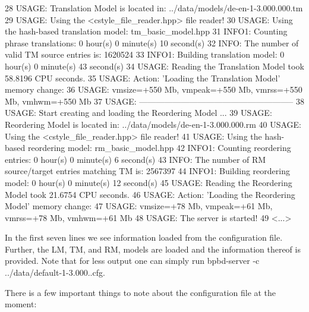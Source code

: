 \begin{DoxyCode}
28 USAGE: Translation Model is located in: ../data/models/de-en-1-3.000.000.tm
29 USAGE: Using the <cstyle\_file\_reader.hpp> file reader!
30 USAGE: Using the hash-based translation model: tm\_basic\_model.hpp
31 INFO1: Counting phrase translations:  0 hour(s) 0 minute(s) 10 second(s) 
32 INFO: The number of valid TM source entries is: 1620524
33 INFO1: Building translation model:  0 hour(s) 0 minute(s) 43 second(s) 
34 USAGE: Reading the Translation Model took 58.8196 CPU seconds.
35 USAGE: Action: 'Loading the Translation Model' memory change:
36 USAGE: vmsize=+550 Mb, vmpeak=+550 Mb, vmrss=+550 Mb, vmhwm=+550 Mb
37 USAGE: --------------------------------------------------------
38 USAGE: Start creating and loading the Reordering Model ...
39 USAGE: Reordering Model is located in: ../data/models/de-en-1-3.000.000.rm
40 USAGE: Using the <cstyle\_file\_reader.hpp> file reader!
41 USAGE: Using the hash-based reordering model: rm\_basic\_model.hpp
42 INFO1: Counting reordering entries:  0 hour(s) 0 minute(s) 6 second(s) 
43 INFO: The number of RM source/target entries matching TM is: 2567397
44 INFO1: Building reordering model:  0 hour(s) 0 minute(s) 12 second(s) 
45 USAGE: Reading the Reordering Model took 21.6754 CPU seconds.
46 USAGE: Action: 'Loading the Reordering Model' memory change:
47 USAGE: vmsize=+78 Mb, vmpeak=+61 Mb, vmrss=+78 Mb, vmhwm=+61 Mb
48 USAGE: The server is started!
49 <...>
\end{DoxyCode}
 In the first seven lines we see information loaded from the configuration file. Further, the L\+M, T\+M, and R\+M, models are loaded and the information thereof is provided. Note that for less output one can simply run {\ttfamily bpbd-\/server -\/c ../data/default-\/1-\/3.000..\+cfg}.

There is a few important things to note about the configuration file at the moment\+:



